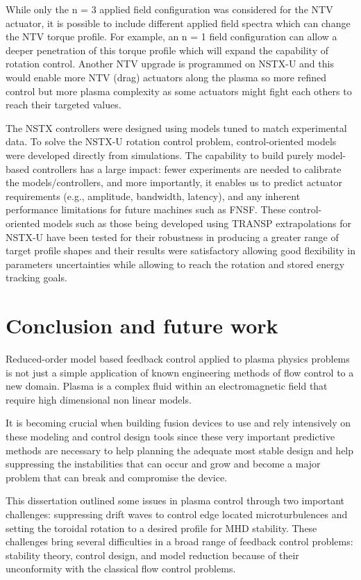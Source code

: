 \documentclass[12pt,lot, lof]{puthesis}
\begin{document}
While only the n = 3 applied field configuration was considered for the NTV actuator, it is possible to include different applied field spectra which can change the NTV torque profile. For example, an n = 1 field configuration can allow a deeper penetration of this torque profile which will expand the capability of rotation control. Another NTV upgrade is programmed on NSTX-U and this would enable more NTV (drag) actuators along the plasma so more refined control but more plasma complexity as some actuators might fight each others to reach their targeted values.

The NSTX controllers were designed using models tuned to match experimental data. To solve the NSTX-U rotation control problem, control-oriented models were developed directly from simulations. The capability to build purely model-based controllers has a large impact: fewer experiments are needed to calibrate the models/controllers, and more importantly, it enables us to predict actuator requirements (e.g., amplitude, bandwidth, latency), and any inherent performance limitations for future machines such as FNSF. These control-oriented models such as those being developed using TRANSP extrapolations for NSTX-U have been tested for their robustness in producing a greater range of target profile shapes and their results were satisfactory allowing good flexibility in parameters uncertainties while allowing to reach the rotation and stored energy tracking goals.


\chapter{Conclusion and future work}

Reduced-order model based feedback control applied to plasma physics problems is not just a simple application of known engineering methods of flow control to a new domain. Plasma is a complex fluid within an electromagnetic field that require high dimensional  non linear models.
 
It is becoming crucial when building fusion devices to use and rely intensively on these modeling and control design tools since these very important predictive methods are necessary to help planning the adequate most stable design and help suppressing the instabilities that can occur and grow and become a major problem that can break and compromise the device. 

This dissertation outlined some issues in plasma control through two important challenges: suppressing drift waves to control edge located microturbulences and setting the toroidal rotation to a desired profile for MHD stability. These challenges bring several difficulties in a broad range of feedback control problems: stability theory, control design, and model reduction because of their unconformity with the classical flow control problems.
\end{document}
